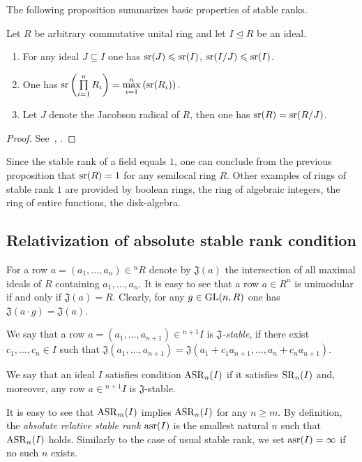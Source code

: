 The following proposition summarizes basic properties of stable ranks.
\begin{prop} \label{prop:sr_properties}
Let $R$ be arbitrary commutative unital ring and let $I\trianglelefteq R$ be an ideal.
\begin{enumerate}
\item For any ideal $J\subseteq I$ one has $\operatorname{sr}(J)\leqslant\operatorname{sr}(I)$, $\operatorname{sr}(I/J)\leqslant\operatorname{sr}(I)$.
\item One has $\operatorname{sr}\left(\prod\limits_{i=1}^n R_i\right)=\max\limits_{i=1}^n\left(\operatorname{sr}(R_i)\right).$
\item Let $J$ denote the Jacobson radical of $R$, then one has $\operatorname{sr}(R)=\operatorname{sr}(R/J)$.
\end{enumerate}
\end{prop}
\begin{proof} See~\cite[Theorem~2.3]{Va69}, \cite{Va71}. 
\end{proof}
\begin{example}
Since the stable rank of a field equals $1$, one can conclude from the previous proposition that $\operatorname{sr}(R)=1$ for any semilocal ring $R$.
Other examples of rings of stable rank $1$ are provided by boolean rings, the ring of algebraic integers, the ring of entire functions, the disk-algebra.
\end{example}

\subsection{Relativization of absolute stable rank condition}
For a row $a=(a_1,\ldots,a_n)\in{}^n\!R$ denote by $\mathfrak{J}(a)$ the intersection of all maximal ideals of $R$ containing $a_1,\ldots,a_n$.
It is easy to see that a row $a\in R^n$ is unimodular if and only if $\mathfrak{J}(a)=R$. 
Clearly, for any $g\in\operatorname{GL}(n,R)$ one has $\mathfrak{J}(a\cdot g)=\mathfrak{J}(a)$.
\begin{dfn}\label{dfn:j-stable}
We say that a row $a=(a_1,\ldots,a_{n+1})\in{}^{n+1}\!I$ is {\it $\mathfrak{J}$-stable}, if there exist $c_1,\ldots,c_n\in I$ such that
$\mathfrak{J}(a_1,\ldots,a_{n+1})=\mathfrak{J}(a_1+c_1a_{n+1},\ldots,a_n+c_na_{n+1}).$
\end{dfn}
\begin{dfn}\label{dfn:asr}
We say that an ideal $I$ satisfies condition $\operatorname{ASR}_n(I)$ if it satisfies $\operatorname{SR}_n(I)$ and, moreover, any row $a\in{}^{n+1}\!I$ is $\mathfrak{J}$-stable.
\end{dfn}

It is easy to see that $\operatorname{ASR}_m(I)$ implies $\operatorname{ASR}_n(I)$ for any $n\geqslant m$. 
By definition, the \emph{absolute relative stable rank} $\operatorname{asr}(I)$ is the smallest natural $n$ such that $\operatorname{ASR}_n(I)$ holds. 
Similarly to the case of usual stable rank, we set $\operatorname{asr}(I)=\infty$ if no such $n$ exists.

